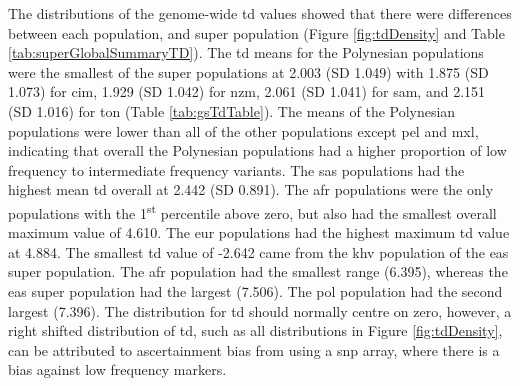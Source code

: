 \documentclass[twoside,openright]{report}
\begin{document}
The distributions of the genome-wide \gls{td} values showed that there
were differences between each population, and super population (Figure
\ref{fig:tdDensity} and Table \ref{tab:superGlobalSummaryTD}). The
\gls{td} means for the Polynesian populations were the smallest of the
super populations at 2.003 (SD 1.049) with 1.875 (SD 1.073) for
\gls{cim}, 1.929 (SD 1.042) for \gls{nzm}, 2.061 (SD 1.041) for
\gls{sam}, and 2.151 (SD 1.016) for \gls{ton} (Table
\ref{tab:gsTdTable}). The means of the Polynesian populations were lower
than all of the other populations except \gls{pel} and \gls{mxl},
indicating that overall the Polynesian populations had a higher
proportion of low frequency to intermediate frequency variants. The
\gls{sas} populations had the highest mean \gls{td} overall at 2.442 (SD
0.891). The \gls{afr} populations were the only populations with the
1\textsuperscript{st} percentile above zero, but also had the smallest
overall maximum value of 4.610. The \gls{eur} populations had the
highest maximum \gls{td} value at 4.884. The smallest \gls{td} value of
-2.642 came from the \gls{khv} population of the \gls{eas} super
population. The \gls{afr} population had the smallest range (6.395),
whereas the \gls{eas} super population had the largest (7.506). The
\gls{pol} population had the second largest (7.396). The distribution
for \gls{td} should normally centre on zero, however, a right shifted
distribution of \gls{td}, such as all distributions in Figure
\ref{fig:tdDensity}, can be attributed to ascertainment bias from using
a \gls{snp} array, where there is a bias against low frequency markers.

\begin{table}

\caption{\label{tab:unnamed-chunk-5}\label{tab:superGlobalSummaryTD} Summary statistics for \gls{td} by super population.}
\centering
{}
\end{table}
\end{document}
